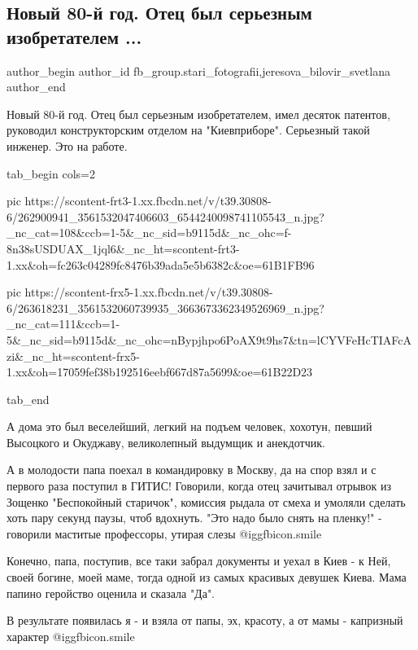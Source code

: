  
 
 
 
 
 
\subsection{Новый 80-й год. Отец был серьезным изобретателем ...}
\label{sec:02_12_2021.fb.fb_group.stari_fotografii.1.otec}
 
\ifcmt
 author_begin
   author_id fb_group.stari_fotografii,jeresova_bilovir_svetlana
 author_end
\fi

Новый 80-й год. Отец был серьезным изобретателем, имел десяток патентов,
руководил конструкторским отделом на "Киевприборе". Серьезный такой инженер.
Это на работе.


\ifcmt
  tab_begin cols=2

     pic https://scontent-frt3-1.xx.fbcdn.net/v/t39.30808-6/262900941_3561532047406603_6544240098741105543_n.jpg?_nc_cat=108&ccb=1-5&_nc_sid=b9115d&_nc_ohc=f-8n38sUSDUAX_1jql6&_nc_ht=scontent-frt3-1.xx&oh=fc263c04289fc8476b39ada5e5b6382c&oe=61B1FB96

     pic https://scontent-frx5-1.xx.fbcdn.net/v/t39.30808-6/263618231_3561532060739935_3663673362349526969_n.jpg?_nc_cat=111&ccb=1-5&_nc_sid=b9115d&_nc_ohc=nBypjhpo6PoAX9t9hs7&tn=lCYVFeHcTIAFcAzi&_nc_ht=scontent-frx5-1.xx&oh=17059fef38b192516eebf667d87a5699&oe=61B22D23

  tab_end
\fi

А дома это был веселейший, легкий на подъем человек, хохотун, певший Высоцкого
и Окуджаву, великолепный выдумщик и анекдотчик.

А в молодости папа поехал в командировку в Москву, да на спор взял и с первого
раза поступил в ГИТИС! Говорили, когда отец зачитывал отрывок из Зощенко
"Беспокойный старичок", комиссия рыдала от смеха и умоляли сделать хоть пару
секунд паузы, чтоб вдохнуть. "Это надо было снять на пленку!" - говорили
маститые профессоры, утирая слезы  @igg{fbicon.smile} 

Конечно, папа, поступив, все таки забрал документы и уехал в Киев - к Ней,
своей богине, моей маме, тогда одной из самых красивых девушек Киева. Мама
папино геройство оценила и сказала "Да".

В результате появилась я - и взяла от папы, эх, красоту, а от мамы - капризный
характер  @igg{fbicon.smile} 

